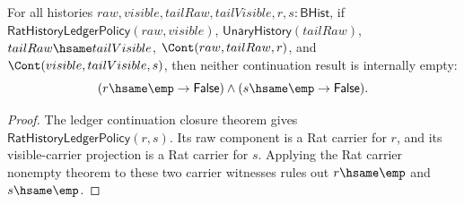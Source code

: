 \begin{theorem}
\label{thm:field-rat-history-ledger-continuation-results-not-empty}
For all histories
$raw,visible,tailRaw,tailVisible,r,s:\mathsf{BHist}$, if
$\mathsf{RatHistoryLedgerPolicy}(raw,visible)$,
$\mathsf{UnaryHistory}(tailRaw)$, $tailRaw\hsame tailVisible$,
$\Cont(raw,tailRaw,r)$, and $\Cont(visible,tailVisible,s)$, then neither
continuation result is internally empty:
$$
(r\hsame\emp\to\mathsf{False})\land
(s\hsame\emp\to\mathsf{False}).
$$
\end{theorem}
\begin{proof}
The ledger continuation closure theorem gives
$\mathsf{RatHistoryLedgerPolicy}(r,s)$. Its raw component is a Rat carrier for
$r$, and its visible-carrier projection is a Rat carrier for $s$. Applying the
Rat carrier nonempty theorem to these two carrier witnesses rules out
$r\hsame\emp$ and $s\hsame\emp$.
\end{proof}

